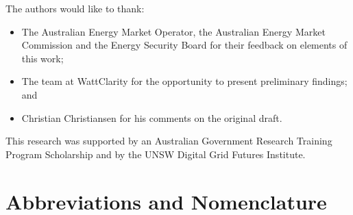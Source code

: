 \documentclass[12pt,a4paper,]{report}
\providecommand{\tightlist}{%
  \setlength{\itemsep}{0pt}\setlength{\parskip}{0pt}}
\begin{document}
The authors would like to thank:

\begin{itemize}
\tightlist
\item
  The Australian Energy Market Operator, the Australian Energy Market
  Commission and the Energy Security Board for their feedback on
  elements of this work;
\item
  The team at WattClarity for the opportunity to present preliminary
  findings; and
\item
  Christian Christiansen for his comments on the original draft.
\end{itemize}

This research was supported by an Australian Government Research
Training Program Scholarship and by the UNSW Digital Grid Futures
Institute. \newpage


\tableofcontents

\newpage

\listoffigures

\newpage

\listoftables

\newpage

\hypertarget{abbreviations-and-nomenclature}{%
\chapter*{Abbreviations and
Nomenclature}\label{abbreviations-and-nomenclature}}
\end{document}
